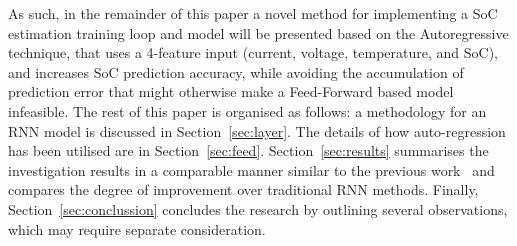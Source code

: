 %
%
As such, in the remainder of this paper a novel method for implementing a SoC estimation training loop and model will be presented based on the Autoregressive technique, that uses a 4-feature input (current, voltage, temperature, and SoC), and increases SoC prediction accuracy, while avoiding the accumulation of prediction error that might otherwise make a Feed-Forward based model infeasible.
The rest of this paper is organised as follows: a methodology for an RNN model is discussed in Section~\ref{sec:layer}.
The details of how auto-regression has been utilised are in Section~\ref{sec:feed}.
Section~\ref{sec:results} summarises the investigation results in a comparable manner similar to the previous work~\cite{sadykov_practical_2022} and compares the degree of improvement over traditional RNN methods.
Finally, Section~\ref{sec:conclussion} concludes the research by outlining several observations, which may require separate consideration.

